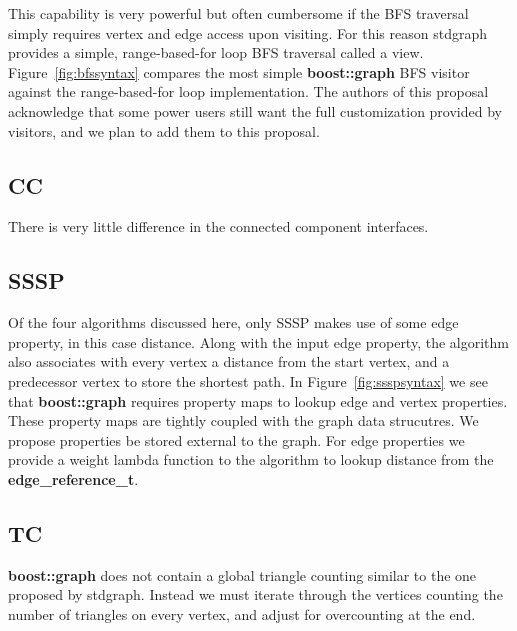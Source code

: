 This capability is very powerful but often cumbersome if the BFS traversal
simply requires vertex and edge access upon visiting.
For this reason stdgraph provides a simple, range-based-for loop BFS traversal
called a view.
Figure~\ref{fig:bfssyntax} compares the most simple \textbf{boost::graph}
BFS visitor against the range-based-for loop implementation.
The authors of this proposal acknowledge that some power users still want
the full customization provided by visitors,
and we plan to add them to this proposal.

\subsection{CC}
There is very little difference in the connected component interfaces.

\subsection{SSSP}
Of the four algorithms discussed here, only SSSP makes use of some edge property, in this case distance.
Along with the input edge property, the algorithm also associates with
every vertex a distance from the start vertex, and a predecessor
vertex to store the shortest path.
In Figure~\ref{fig:ssspsyntax} we see that \textbf{boost::graph} requires
property maps to lookup edge and vertex properties.
These property maps are tightly coupled with the graph data strucutres.
We propose properties be stored external to the graph.
For edge properties we provide a weight lambda function to the algorithm
to lookup distance from the \textbf{edge\_reference\_t}.

\subsection{TC}
\textbf{boost::graph} does not contain a global triangle counting
similar to the one proposed by stdgraph.
Instead we must iterate through the vertices counting the number of triangles
on every vertex, and adjust for overcounting at the end.







